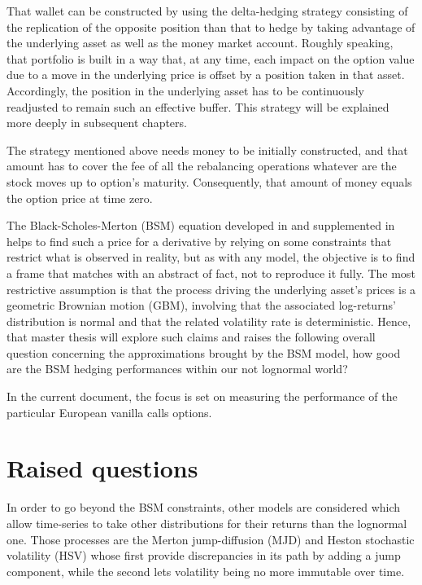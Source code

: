 \documentclass[12pt,a4paper]{report}
\begin{document}
That wallet can be constructed by using the delta-hedging strategy consisting of the replication of the opposite position than that to hedge by taking advantage of the underlying asset as well as the money market account.
Roughly speaking, that portfolio is built in a way that, at any time, each impact on the option value due to a move in the underlying price is offset by a position taken in that asset.
Accordingly, the position in the underlying asset has to be continuously readjusted to remain such an effective buffer.
This strategy will be explained more deeply in subsequent chapters.

The strategy mentioned above needs money to be initially constructed, and that amount has to cover the fee of all the rebalancing operations whatever are the stock moves up to option's maturity.
Consequently, that amount of money equals the option price at time zero.

The Black-Scholes-Merton (BSM) equation developed in \citet{bs} and supplemented in \citet{merton73} helps to find such a price for a derivative by relying on some constraints that restrict what is observed in reality, but as with any model, the objective is to find a frame that matches with an abstract of fact, not to reproduce it fully.
The most restrictive assumption is that the process driving the underlying asset's prices is a geometric Brownian motion (GBM), involving that the associated log-returns' distribution is normal and that the related volatility rate is deterministic.
Hence, that master thesis will explore such claims and raises the following overall question concerning the approximations brought by the BSM model, how good are the BSM hedging performances within our not lognormal world?

In the current document, the focus is set on measuring the performance of the particular  European vanilla calls options.


\section{Raised questions}
\label{sec:Introduction:raised}

In order to go beyond the BSM constraints, other models are considered which allow time-series to take other distributions for their returns than the lognormal one.
Those processes are the Merton jump-diffusion (MJD) and Heston stochastic volatility (HSV) whose first provide discrepancies in its path by adding a jump component, while the second lets volatility being no more immutable over time.
\end{document}
